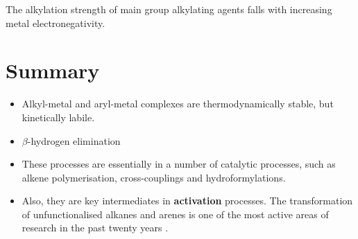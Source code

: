\documentclass[a4paper]{tufte-handout}
\begin{document}
The alkylation strength of main group alkylating agents falls with increasing metal electronegativity.

\section{Summary}

\begin{itemize}
  \item Alkyl-metal and aryl-metal complexes are thermodynamically stable, but kinetically labile.
  \item $\beta$-hydrogen elimination 
  \item These processes are essentially in a number of catalytic processes, such as alkene polymerisation, cross-couplings and hydroformylations.
  \item Also, they are key intermediates in \textbf{ activation} processes. The transformation of unfunctionalised alkanes and arenes is one of the most active areas of research in the past twenty years \cite{guillemard2021late}.
\end{itemize}



\end{document}
